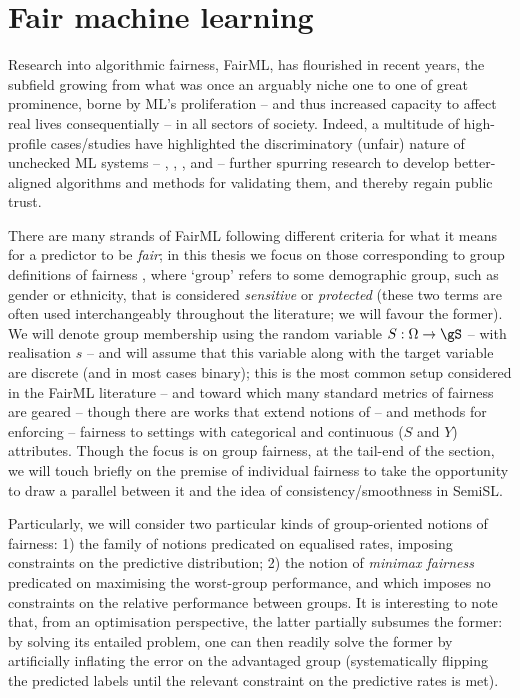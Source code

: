 \section{Fair machine learning}\label{sec:fairml}
Research into algorithmic fairness, FairML, has flourished in recent years, the subfield growing
from what was once an arguably niche one to one of great prominence, borne by ML's proliferation --
and thus increased capacity to affect real lives consequentially -- in all sectors of society.
%
Indeed, a multitude of high-profile cases/studies have highlighted the discriminatory (unfair)
nature of unchecked ML systems -- \cite{kasperkevic2015google}, \cite{angwin2016machine},
\cite{dastin2018amazon}, and \cite{buolamwini2018gender} -- further spurring research to develop
better-aligned algorithms and methods for validating them, and thereby regain public trust.

%
There are many strands of FairML following different criteria for what it means for a
predictor to be \emph{fair}; in this thesis we focus on those corresponding to group definitions of
fairness \citep{barocas2019fairness}, where `group' refers to some demographic group, such as
gender or ethnicity, that is considered \emph{sensitive} or \emph{protected} (these two terms are
often used interchangeably throughout the literature; we will favour the former).
%
We will denote group membership using the random variable \( S: \Omega \to \gS \) -- with
realisation \(s\) -- and will assume that this variable along with the target variable are discrete
(and in most cases binary); this is the most common setup considered in the FairML literature --
and toward which many standard metrics of fairness are geared \citep{feldman2015certifying,
hardt2016equality, woodworth2017learning} -- though there are works that extend notions of -- and
methods for enforcing -- fairness to settings with categorical and continuous (\( S \) and \( Y \))
attributes.
%
Though the focus is on group fairness, at the tail-end of the section, we will touch briefly on the
premise of individual fairness \citep{dwork2012fairness} to take the opportunity to draw a parallel
between it and the idea of consistency/smoothness in SemiSL.

%
Particularly, we will consider two particular kinds of group-oriented notions of fairness: 1) the
family of notions predicated on equalised rates, imposing constraints on the predictive
distribution; 2) the notion of \emph{minimax fairness} predicated on maximising the worst-group
performance, and which imposes no constraints on the relative performance between groups.
%
It is interesting to note that, from an optimisation perspective, the latter partially subsumes the
former: by solving its entailed problem, one can then readily solve the former by artificially
inflating the error on the advantaged group (systematically flipping the predicted labels until the
relevant constraint on the predictive rates is met).

